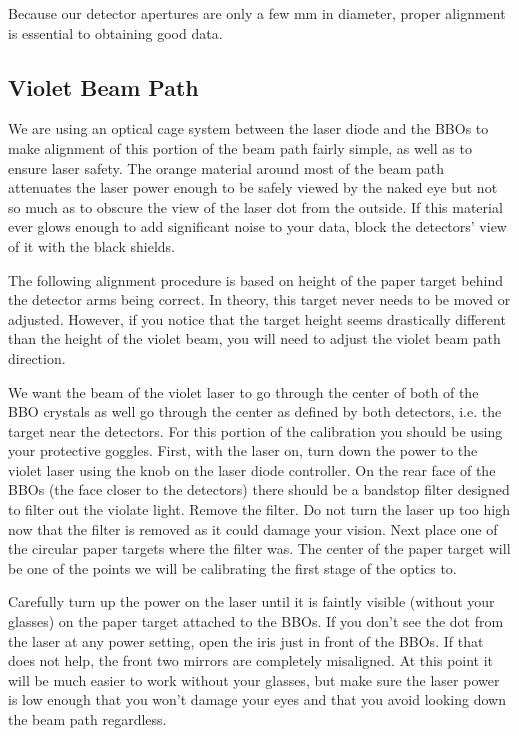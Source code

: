 \documentclass{../lab}
\begin{document}
Because our detector apertures are only a few mm in diameter, proper alignment is essential to obtaining good data.

\subsection{Violet Beam Path}

We are using an optical cage system between the laser diode and the BBOs to make alignment of this portion of the beam path fairly simple, as well as to ensure laser safety. The orange material around most of the beam path attenuates the laser power enough to be safely viewed by the naked eye but not so much as to obscure the view of the laser dot from the outside. If this material ever glows enough to add significant noise to your data, block the detectors' view of it with the black shields.

The following alignment procedure is based on height of the paper target behind the detector arms being correct. In theory, this target never needs to be moved or adjusted. However, if you notice that the target height seems drastically different than the height of the violet beam, you will need to adjust the violet beam path direction.

We want the beam of the violet laser to go through the center of both of the BBO crystals as well go through the center as defined by both detectors, i.e. the target near the detectors. For this portion of the calibration you should be using your protective goggles. First, with the laser on, turn down the power to the violet laser using the knob on the laser diode controller. On the rear face of the BBOs (the face closer to the detectors) there should be a bandstop filter designed to filter out the violate light. Remove the filter. Do not turn the laser up too high now that the filter is removed as it could damage your vision. Next place one of the circular paper targets where the filter was. The center of the paper target will be one of the points we will be calibrating the first stage of the optics to.

Carefully turn up the power on the laser until it is faintly visible (without your glasses) on the paper target attached to the BBOs. If you don't see the dot from the laser at any power setting, open the iris just in front of the BBOs. If that does not help, the front two mirrors are completely misaligned. At this point it will be much easier to work without your glasses, but make sure the laser power is low enough that you won't damage your eyes and that you avoid looking down the beam path regardless.
\end{document}
